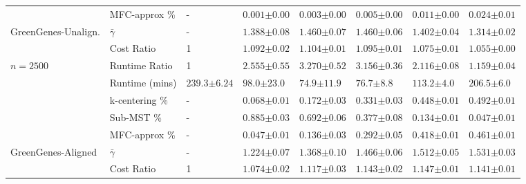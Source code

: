 \begin{table}[t!]
{\begin{tabular}{ llllllll }
			& MFC-approx \% & - & $ 0.001  \scriptstyle{ \pm  0.00  } $ & $ 0.003  \scriptstyle{ \pm  0.00  } $ & $ 0.005  \scriptstyle{ \pm  0.00  } $ & $ 0.011  \scriptstyle{ \pm  0.00  } $ & $ 0.024  \scriptstyle{ \pm  0.01  } $ \\
			\cmidrule(lr){1-8}
			GreenGenes-Unalign. & $ \bar{\gamma} $ & - & $ 1.388  \scriptstyle{ \pm  0.08  } $ & $ 1.460  \scriptstyle{ \pm  0.07  } $ & $ 1.460  \scriptstyle{ \pm  0.06  } $ & $ 1.402  \scriptstyle{ \pm  0.04  } $ & $ 1.314  \scriptstyle{ \pm  0.02  } $ \\
			& Cost Ratio & 1 & $ 1.092  \scriptstyle{ \pm  0.02  } $ & $ 1.104  \scriptstyle{ \pm  0.01  } $ & $ 1.095  \scriptstyle{ \pm  0.01  } $ & $ 1.075  \scriptstyle{ \pm  0.01  } $ & $ 1.055  \scriptstyle{ \pm  0.00  } $ \\
			$ n=2500$ & Runtime Ratio & 1 & $ 2.555  \scriptstyle{ \pm  0.55  } $ & $ 3.270  \scriptstyle{ \pm  0.52  } $ & $ 3.156  \scriptstyle{ \pm  0.36  } $ & $ 2.116  \scriptstyle{ \pm  0.08  } $ & $ 1.159  \scriptstyle{ \pm  0.04  } $ \\
			& Runtime (mins) & $239.3 \scriptstyle{ \pm 6.24 } $ & $ 98.0  \scriptstyle{ \pm  23.0  } $ & $ 74.9  \scriptstyle{ \pm  11.9  } $ & $ 76.7  \scriptstyle{ \pm  8.8  } $ & $ 113.2  \scriptstyle{ \pm  4.0  } $ & $ 206.5  \scriptstyle{ \pm  6.0  } $ \\
			& k-centering \% & - & $ 0.068  \scriptstyle{ \pm  0.01  } $ & $ 0.172  \scriptstyle{ \pm  0.03  } $ & $ 0.331  \scriptstyle{ \pm  0.03  } $ & $ 0.448  \scriptstyle{ \pm  0.01  } $ & $ 0.492  \scriptstyle{ \pm  0.01  } $ \\
			& Sub-MST \% & - & $ 0.885  \scriptstyle{ \pm  0.03  } $ & $ 0.692  \scriptstyle{ \pm  0.06  } $ & $ 0.377  \scriptstyle{ \pm  0.08  } $ & $ 0.134  \scriptstyle{ \pm  0.01  } $ & $ 0.047  \scriptstyle{ \pm  0.01  } $ \\
			& MFC-approx \% & - & $ 0.047  \scriptstyle{ \pm  0.01  } $ & $ 0.136  \scriptstyle{ \pm  0.03  } $ & $ 0.292  \scriptstyle{ \pm  0.05  } $ & $ 0.418  \scriptstyle{ \pm  0.01  } $ & $ 0.461  \scriptstyle{ \pm  0.01  } $ \\
			\cmidrule(lr){1-8}
			GreenGenes-Aligned & $ \bar{\gamma} $ & - & $ 1.224  \scriptstyle{ \pm  0.07  } $ & $ 1.368  \scriptstyle{ \pm  0.10  } $ & $ 1.466  \scriptstyle{ \pm  0.06  } $ & $ 1.512  \scriptstyle{ \pm  0.05  } $ & $ 1.531  \scriptstyle{ \pm  0.03  } $ \\
			& Cost Ratio & 1 & $ 1.074  \scriptstyle{ \pm  0.02  } $ & $ 1.117  \scriptstyle{ \pm  0.03  } $ & $ 1.143  \scriptstyle{ \pm  0.02  } $ & $ 1.147  \scriptstyle{ \pm  0.01  } $ & $ 1.141  \scriptstyle{ \pm  0.01  } $ \\

\end{tabular}}
\end{table}
